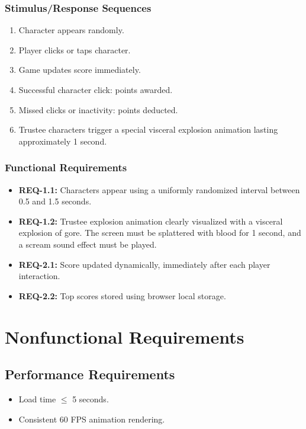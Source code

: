 \documentclass{scrreprt}
\begin{document}
\subsection{Stimulus/Response Sequences}
\begin{enumerate}
    \item Character appears randomly.
    \item Player clicks or taps character.
    \item Game updates score immediately.
    \item Successful character click: points awarded.
    \item Missed clicks or inactivity: points deducted.
    \item Trustee characters trigger a special visceral explosion animation lasting approximately 1 second.
\end{enumerate}

\subsection{Functional Requirements}
\begin{itemize}
    \item \textbf{REQ-1.1:} Characters appear using a uniformly randomized interval between 0.5 and 1.5 seconds.
    \item \textbf{REQ-1.2:} Trustee explosion animation clearly visualized with a visceral explosion of gore. The screen must be splattered with blood for 1 second, and a scream sound effect must be played.
    \item \textbf{REQ-2.1:} Score updated dynamically, immediately after each player interaction.
    \item \textbf{REQ-2.2:} Top scores stored using browser local storage.
\end{itemize}

\chapter{Nonfunctional Requirements}

\section{Performance Requirements}
\begin{itemize}
    \item Load time $\leq$ 5 seconds.
    \item Consistent 60 FPS animation rendering.
\end{itemize}
\end{document}
